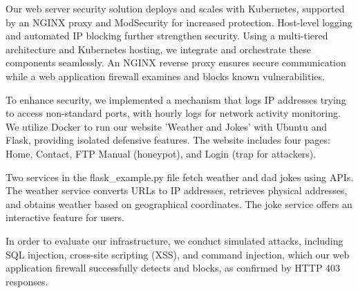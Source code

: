 Our web server security solution deploys and scales with Kubernetes, supported by an NGINX proxy and ModSecurity for increased protection. Host-level logging and automated IP blocking further strengthen security. Using a multi-tiered architecture and Kubernetes hosting, we integrate and orchestrate these components seamlessly. An NGINX reverse proxy ensures secure communication while a web application firewall examines and blocks known vulnerabilities.

To enhance security, we implemented a mechanism that logs IP addresses trying to access non-standard ports, with hourly logs for network activity monitoring. We utilize Docker to run our website 'Weather and Jokes' with Ubuntu and Flask, providing isolated defensive features. The website includes four pages: Home, Contact, FTP Manual (honeypot), and Login (trap for attackers).

Two services in the flask_example.py file fetch weather and dad jokes using APIs. The weather service converts URLs to IP addresses, retrieves physical addresses, and obtains weather based on geographical coordinates. The joke service offers an interactive feature for users.

In order to evaluate our infrastructure, we conduct simulated attacks, including SQL injection, cross-site scripting (XSS), and command injection, which our web application firewall successfully detects and blocks, as confirmed by HTTP 403 responses.
